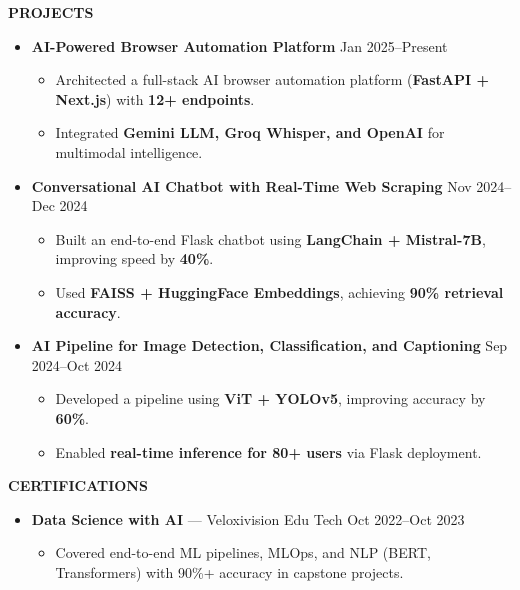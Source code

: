 \documentclass[a4paper,10pt]{article}
\newcommand{\resheading}[1]{%
  \vspace{1em}%
  \noindent\colorbox{mygrey}{%
    \parbox{\dimexpr\linewidth-2\fboxsep\relax}{%
      \textbf{#1}%
    }%
  }%
  \vspace{0.6em}%
}
\begin{document}
\resheading{PROJECTS}
\vspace{0.4em}
\begin{itemize}
  \item \textbf{AI-Powered Browser Automation Platform} \hfill Jan 2025–Present
  \begin{itemize}
    \item Architected a full-stack AI browser automation platform (\textbf{FastAPI + Next.js}) with \textbf{12+ endpoints}.
    \item Integrated \textbf{Gemini LLM, Groq Whisper, and OpenAI} for multimodal intelligence.
  \end{itemize}

  \item \textbf{Conversational AI Chatbot with Real-Time Web Scraping} \hfill Nov 2024–Dec 2024
  \begin{itemize}
    \item Built an end-to-end Flask chatbot using \textbf{LangChain + Mistral-7B}, improving speed by \textbf{40\%}.
    \item Used \textbf{FAISS + HuggingFace Embeddings}, achieving \textbf{90\% retrieval accuracy}.
  \end{itemize}

  \item \textbf{AI Pipeline for Image Detection, Classification, and Captioning} \hfill Sep 2024–Oct 2024
  \begin{itemize}
    \item Developed a pipeline using \textbf{ViT + YOLOv5}, improving accuracy by \textbf{60\%}.
    \item Enabled \textbf{real-time inference for 80+ users} via Flask deployment.
  \end{itemize}
\end{itemize}

\resheading{CERTIFICATIONS}
\vspace{0.4em}
\begin{itemize}
  \item \textbf{Data Science with AI} — Veloxivision Edu Tech \hfill Oct 2022–Oct 2023
  \begin{itemize}
    \item Covered end-to-end ML pipelines, MLOps, and NLP (BERT, Transformers) with 90\%+ accuracy in capstone projects.
  \end{itemize}
\end{itemize}
\end{document}
